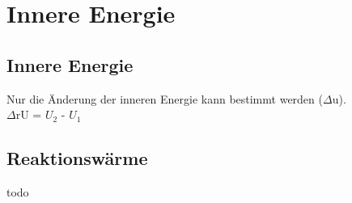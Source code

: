 \section{Innere Energie} \label{sec:innere_energie}

\subsection{Innere Energie}
Nur die Änderung der inneren Energie kann bestimmt werden ($\Delta$u). \\
$\Delta$rU = $U_2$ - $U_1$

\subsection{Reaktionswärme}
todo
